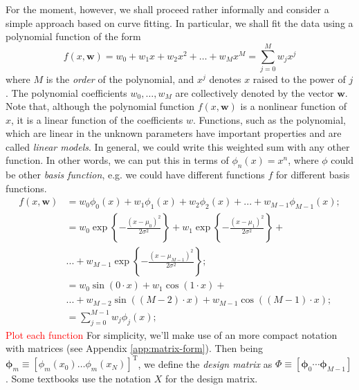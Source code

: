 \documentclass{article} %
\begin{document}
For the moment, however, we shall proceed rather informally and consider a simple approach based on curve fitting. In particular, we shall fit the data using a polynomial function of the form
%
\begin{equation}
      f(x, \mathbf{w})=w_{0}+w_{1} x+w_{2} x^{2}+\ldots+w_{M} x^{M}=\sum_{j=0}^{M} w_{j} x^{j}
      \label{eq:intro-poly}
\end{equation}
%
where $M$ is the \textit{order} of the polynomial, and $x^j$ denotes $x$ raised to the power of $j$. The polynomial coefficients $w_0, \dots , w_M$ are collectively denoted by the vector $\mathbf{w}$. Note that, although the polynomial function $f(x, \mathbf{w})$ is a nonlinear function of $x$, it is a linear function of the coefficients $w$. Functions, such as the polynomial, which are linear in the unknown parameters have important properties and are called \textit{linear models}. In general, we could write this weighted sum with any other function. In other words, we can put this in terms of $\phi_n(x)=x^n$, where $\phi$ could be other \textit{basis function}, e.g. we could have different functions $f$ for different basis functions.
%
\begin{align*}
      f(x,\mathbf{w}) &= w_0 \phi_0(x) +w_1 \phi_1(x) +w_2 \phi_2(x)  + ... + w_{M-1} \phi_{M-1}(x); \\
                        &= w_0 \exp\left\{ - \frac{(x-\mu_0)^2}{2\sigma^2}\right\} + w_1  \exp\left\{ - \frac{(x-\mu_1)^2}{2\sigma^2}\right\} + \\ & ... + w_{M-1} \exp\left\{ - \frac{(x-\mu_{M-1})^2}{2\sigma^2}\right\}; \\
                        &= w_0 \sin(0 \cdot x) + w_1 \cos(1 \cdot x) + \\ &... + w_{M-2} \sin((M-2) \cdot x) + w_{M-1} \cos((M-1) \cdot x); \\
                        &=\sum_{j=0}^{M-1} w_{j} \phi_{j}(x);
\end{align*}
%
\textcolor{red}{Plot each function}
For simplicity, we'll make use of an more compact notation with matrices (see Appendix \ref{app:matrix-form}). Then being $\boldsymbol{\phi}_m \equiv \left[  \phi_m(x_0) \dots \phi_m(x_N) \right]^{\mathrm{T}}$, we define the \textit{design matrix} as $\Phi \equiv \left[ \boldsymbol{\phi}_0 \cdots \boldsymbol{\phi}_{M-1} \right]$. Some textbooks use the notation $\mathit{X}$ for the design matrix.
\end{document}
